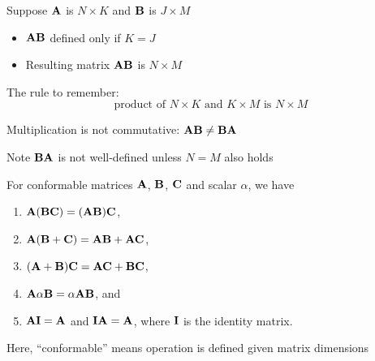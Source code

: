 \begin{frame}
    
    \vspace{2em}
    Suppose $\mathbf A$ is $N \times K$ and $\mathbf B$ is $J \times M$
    
    \begin{itemize}
        \item $\mathbf A \mathbf B$ defined only if $K = J$
        \item Resulting matrix $\mathbf A \mathbf B$ is $N \times M$
    \end{itemize}
    
    \vspace{.7em}
    The rule to remember:
    \begin{equation*}
        \text{product of } N \times K \text{ and } K \times M
        \text{ is }  N \times M
    \end{equation*}

    Multiplication is not commutative: $\mathbf A \mathbf B \not= \mathbf B \mathbf A$ 
    
    Note $\mathbf B \mathbf A$ is not well-defined unless $N = M$ also holds 

\end{frame}


\begin{frame}
    
    \vspace{2em}
    \Fact{\eqref{ET-fa:bmari}}
        For conformable matrices $\mathbf A$, $\mathbf B$, $\mathbf C$ and scalar $\alpha$, we have
        \begin{enumerate}
            \item $\mathbf A (\mathbf B \mathbf C) = (\mathbf A \mathbf B) \mathbf C$,
            \item $\mathbf A (\mathbf B + \mathbf C) = \mathbf A \mathbf B + \mathbf A \mathbf C$,
            \item $(\mathbf A + \mathbf B) \mathbf C = \mathbf A \mathbf C + \mathbf B \mathbf C$,
            \item $\mathbf A \alpha \mathbf B = \alpha \mathbf A \mathbf B$, and
            \item $\mathbf A \mathbf I = \mathbf A$ and $\mathbf I \mathbf A = \mathbf A$, where
                $\mathbf I$ is the identity matrix.
        \end{enumerate}
    
    Here, ``conformable'' means operation is defined given matrix dimensions

\end{frame}


